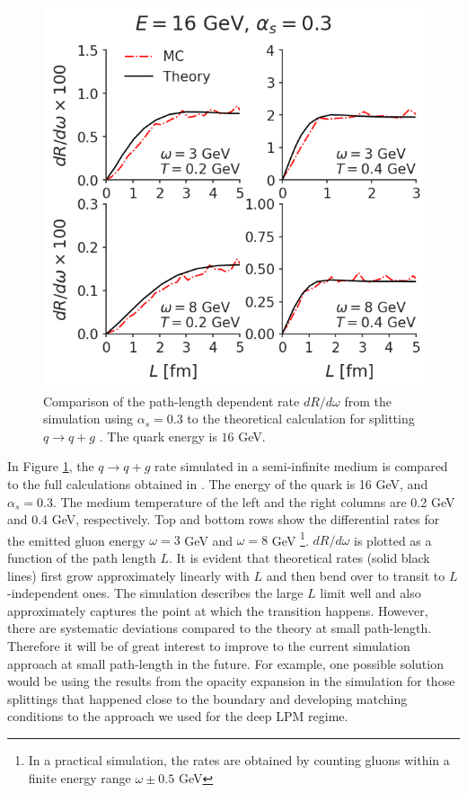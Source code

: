 \documentclass[aps, prc, reprint, amsmath, groupedaddress, nofootinbib]{revtex4-1}
\begin{document}
\begin{figure}
\includegraphics[width=\columnwidth]{spectrum_L.png}
\caption{Comparison of the path-length dependent rate $dR/d\omega$ from the simulation using $\alpha_s = 0.3$ to the theoretical calculation for splitting $q\rightarrow q+g$ \cite{CaronHuot:2010bp}. The quark energy is $16$ GeV.}
\label{fig:spectra-L-alphas=0.3}
\end{figure}

In Figure \ref{fig:spectra-L-alphas=0.3}, the $q\rightarrow q+g$ rate simulated in a semi-infinite medium is compared to the full calculations obtained in \cite{CaronHuot:2010bp}.
The energy of the quark is 16 GeV, and $\alpha_s = 0.3$.
The medium temperature of the left and the right columns are 0.2 GeV and 0.4 GeV, respectively.
Top and bottom rows show the differential rates for the emitted gluon energy $\omega = 3$ GeV and $\omega = 8$ GeV \footnote{In a practical simulation, the rates are obtained by counting gluons within a finite energy range $\omega\pm 0.5$ GeV}.
$dR/d\omega$ is plotted as a function of the path length $L$.
It is evident that theoretical rates (solid black lines) first grow approximately linearly with $L$ and then bend over to transit to $L$-independent ones.
The simulation describes the large $L$ limit well and also approximately captures the point at which the transition happens.
However, there are systematic deviations compared to the theory at small path-length.
Therefore it will be of great interest to improve to the current simulation approach at small path-length in the future. 
For example, one possible solution would be using the results from the opacity expansion in the simulation for those splittings that happened close to the boundary and developing matching conditions to the approach we used for the deep LPM regime.
\end{document}

